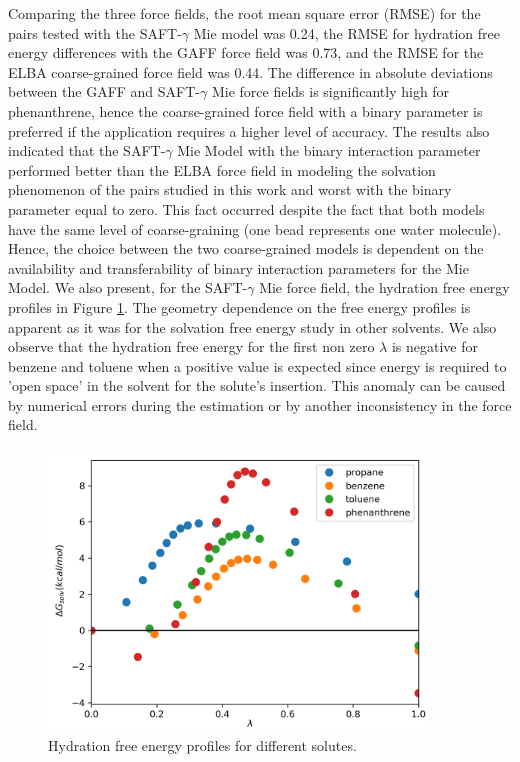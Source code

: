 Comparing the three force fields, the root mean square error (RMSE) for the pairs tested with the SAFT-$\gamma$     Mie model was  0.24, the RMSE for hydration free energy differences with the GAFF force field was 0.73, and the RMSE for the ELBA coarse-grained force field was 0.44. The difference in absolute deviations between the GAFF and SAFT-$\gamma$     Mie force fields is significantly high for phenanthrene, hence the coarse-grained force field with a binary parameter is preferred if the application requires a higher level of accuracy. The results also indicated that the SAFT-$\gamma$ Mie Model with the binary interaction parameter performed better than the ELBA force field in modeling the solvation phenomenon of the pairs studied in this work and worst with the binary parameter equal to zero. This fact occurred despite the fact that both models have the same level of coarse-graining (one bead represents one water molecule). Hence, the choice between the two coarse-grained models is dependent on the availability and transferability of binary interaction parameters for the Mie Model. We also present, for the SAFT-$\gamma$ Mie force field, the hydration free energy profiles in Figure \ref{fig:water}. The geometry dependence on the free energy profiles is apparent as it was for the solvation free energy study in other solvents. We also observe that the hydration free energy for the first non zero $\lambda$ is negative for benzene and toluene when a positive value is expected since energy is required to 'open space' in the solvent for the solute's insertion. This anomaly can be caused by numerical errors during the estimation or by another inconsistency in the force field. 

\begin{figure}[H]
\centering
\includegraphics[width=0.9\textwidth]{Figures/water}
\caption{Hydration free energy profiles for different solutes.}
\label{fig:water}
\end{figure}

